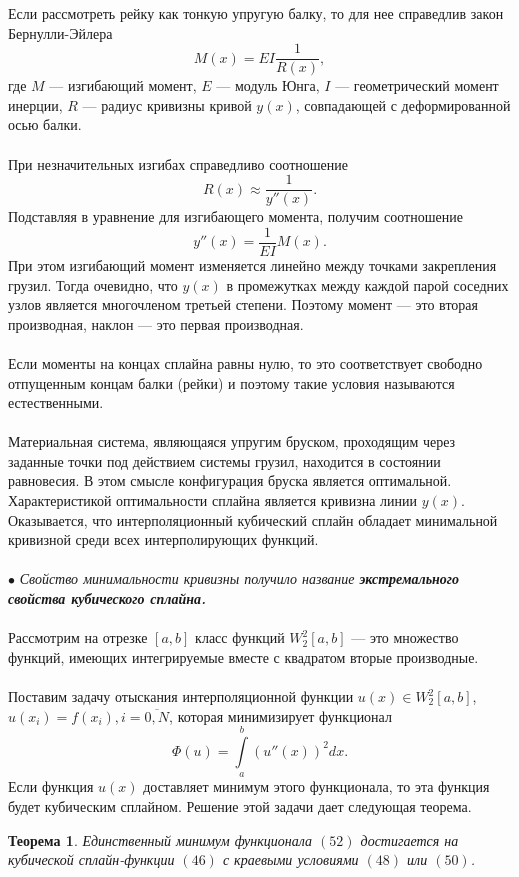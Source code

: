 \documentclass[a4paper, 12pt]{report}
\numberwithin{equation}{section}
\newtheorem*{theorem}{Теорема}
\begin{document}
	 Если рассмотреть рейку как тонкую упругую балку, то для нее справедлив закон Бернулли-Эйлера
	 $$M(x) = EI \dfrac{1}{R(x)},$$ где $M$ --- изгибающий момент, $E$ --- модуль Юнга, $I$ --- геометрический момент инерции, $R$ --- радиус кривизны кривой $y(x)$, совпадающей с деформированной осью балки.\\\\
	 При незначительных изгибах справедливо соотношение $$R(x) \approx \dfrac{1}{y''(x)}.$$ Подставляя в уравнение для изгибающего момента, получим соотношение $$y''(x) = \dfrac{1}{EI}M(x).$$
	 При этом изгибающий момент изменяется линейно между точками закрепления грузил. Тогда очевидно, что $y(x)$ в промежутках между каждой парой соседних узлов является многочленом третьей степени. Поэтому момент --- это вторая производная, наклон --- это первая производная.\\\\
	 Если моменты на концах сплайна равны нулю, то это соответствует свободно отпущенным концам балки (рейки) и поэтому такие условия называются естественными. \\\\
	 Материальная система, являющаяся упругим бруском, проходящим через заданные точки под действием системы грузил, находится в состоянии равновесия. В этом смысле конфигурация бруска является оптимальной. Характеристикой оптимальности сплайна является кривизна линии $y(x)$. Оказывается, что интерполяционный кубический сплайн обладает минимальной кривизной среди всех интерполирующих функций.\\\\
	 $\bullet$ \textit{Свойство минимальности кривизны получило название \textbf{экстремального свойства кубического сплайна.}}\\\\
	 Рассмотрим на отрезке $[a,b]$ класс функций $W_2^2[a,b]$ --- это множество функций, имеющих интегрируемые вместе с квадратом вторые производные.\\\\
	 Поставим задачу отыскания интерполяционной функции $u(x) \in W_2^2[a,b]$, $u(x_i) = f(x_i), i=\overline{0,N}$, которая минимизирует функционал 
	 \begin{equation}
	 	\Phi(u) = \int\limits_a^b (u''(x))^2dx.
	 \end{equation}
	 Если функция $u(x)$ доставляет минимум этого функционала, то эта функция будет кубическим сплайном.  Решение этой задачи дает следующая теорема.
	 \begin{theorem}
	 	Единственный минимум функционала $(52)$ достигается на кубической сплайн-функции $(46)$ с краевыми условиями $(48)$ или $(50)$.
	 \end{theorem}
\end{document}
